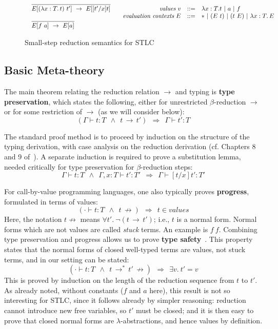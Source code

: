 \documentclass{LMCS}
\newcommand{\To}[0]{\Rightarrow}
\begin{document}
\begin{figure}
\[
\begin{array}{ll}
\begin{array}{l}
\infer{E[(\lambda x:T.\,t)\ t']\ \to\ E[[t'/x]t]}{\ } \\ \\
\infer{E[f\ a]\ \to\ E[a]}{\ }
\end{array}

&

\begin{array}{rll}
\textit{values}\ v & ::= & \lambda x:T. t \ |\ a\ |\ f \\
\textit{evaluation contexts}\ E & ::= & *\ |\ (E\ t)\ |\ (t\ E)\ |\ \lambda x:T.\, E\ \\
\ \\
\end{array}
\end{array}
\]
\caption{Small-step reduction semantics for STLC}
\label{fig:stlcopsem}
\end{figure}

\subsection{Basic Meta-theory}
\label{sec:basicmeta}

The main theorem relating the reduction relation $\to$ and typing is
\textbf{type preservation}, which states the following, either for
unrestricted $\beta$-reduction $\to$ or for some restriction of $\to$
(as we will consider below):
\[
(\Gamma\vdash t:T\ \ \wedge\ \ t\, \to\, t')\ \ \To\ \ \Gamma \vdash t':T
\]

\noindent The standard proof method is to proceed by induction on the
structure of the typing derivation, with case analysis on the
reduction derivation (cf. Chapters 8 and 9 of~\cite{pierce02}).  A separate
induction is required to prove a substitution lemma, needed critically
for type preservation for $\beta$-reduction steps:
\[
\Gamma\vdash t : T\ \ \wedge\ \ \Gamma, x:T \vdash t':T'\ \ \To\ \ \Gamma \vdash[t/x]t':T'
\]

\noindent For call-by-value programming languages, one also typically
proves \textbf{progress}, formulated in terms of values:
\[
( \cdot \vdash t:T\ \ \wedge\ \ t\,\not\to)\ \ \To\ \ t \in\textit{values}
\]
\noindent Here, the notation $t\not\to$ means $\forall
t'.\ \neg(t\,\to\, t')$; i.e., $t$ is a normal form.  Normal forms
which are not values are called \emph{stuck} terms.  An example is
$f\ f$.  Combining type preservation and progress allows us to
prove \textbf{type safety}~\cite{wright+94}.  This property states
that the normal forms of closed well-typed terms are values, not stuck
terms, and in our setting can be stated:
\[
(\cdot \vdash t:T\ \ \wedge\ \ t\, \to^*\, t'\,\not\to)\ \ \To\ \ \exists v.\ t' = v
\]
\noindent This is proved by induction on the length of the reduction
sequence from $t$ to $t'$.  As already noted, without constants ($f$
and $a$ here), this result is not so interesting for STLC, since it
follows already by simpler reasoning: reduction cannot introduce new
free variables, so $t'$ must be closed; and it is then easy to prove
that closed normal forms are $\lambda$-abstractions, and hence values
by definition.
\end{document}
